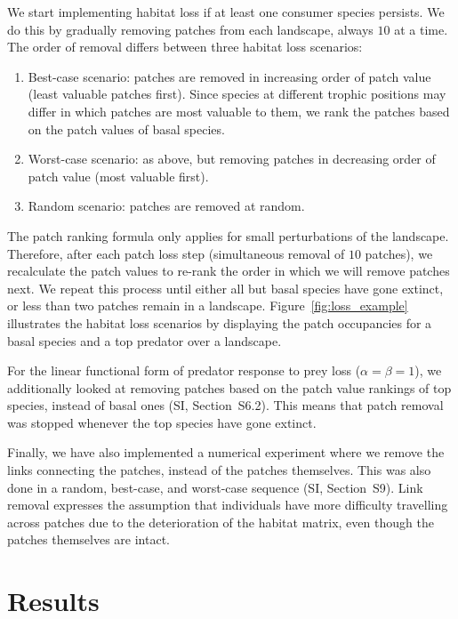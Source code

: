 \documentclass[11pt]{article}
\newcommand{\SI}{SI}
\begin{document}
We start implementing habitat loss if at least one consumer species persists. We do this by gradually removing patches from each landscape, always $10$ at a time. The order of removal differs between three habitat loss scenarios:
\begin{enumerate}
\item Best-case scenario: patches are removed in increasing order of patch value (least valuable patches first). Since species at different trophic positions may differ in which patches are most valuable to them, we rank the patches based on the patch values of basal species.
\item Worst-case scenario: as above, but removing patches in decreasing order of patch value (most valuable first).
\item Random scenario: patches are removed at random.
\end{enumerate}
The patch ranking formula only applies for small perturbations of the landscape. Therefore, after each patch loss step (simultaneous removal of $10$ patches), we recalculate the patch values to re-rank the order in which we will remove patches next. We repeat this process until either all but basal species have gone extinct, or less than two patches remain in a landscape. Figure~\ref{fig:loss_example} illustrates the habitat loss scenarios by displaying the patch occupancies for a basal species and a top predator over a landscape.

For the linear functional form of predator response to prey loss ($\alpha = \beta = 1$), we additionally looked at removing patches based on the patch value rankings of top species, instead of basal ones (\SI, Section~S6.2). This means that patch removal was stopped whenever the top species have gone extinct.

Finally, we have also implemented a numerical experiment where we remove the links connecting the patches, instead of the patches themselves. This was also done in a random, best-case, and worst-case sequence (\SI, Section~S9). Link removal expresses the assumption that individuals have more difficulty travelling across patches due to the deterioration of the habitat matrix, even though the patches themselves are intact.


\section{Results} \label{sec:results}
\end{document}
